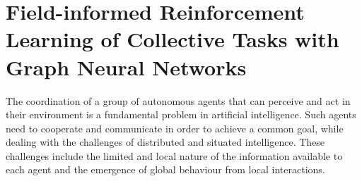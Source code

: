 %

%
\chapter[Field-informed Reinforcement Learning]{Field-informed Reinforcement Learning of Collective Tasks with Graph Neural Networks}\label{chap:rl:field-informed} %
\minitoc%

\newcommand{\ga}[1]{\meta{red}{GA}{#1}}
\newcommand{\lukas}[1]{\meta{purple}{Lukas}{#1}}
\newcommand{\mv}[1]{\meta{green}{MV}{#1}}
\newcommand{\review}[1]{{#1}}
The coordination of a group of autonomous agents that can perceive and act in their environment is a fundamental problem in artificial intelligence. 
Such agents need to cooperate and communicate in order to achieve a common goal, 
 while dealing with the challenges of distributed and situated intelligence. 
 These challenges include the limited and local nature of the information available to each agent and the emergence of global behaviour from local interactions. 

%


